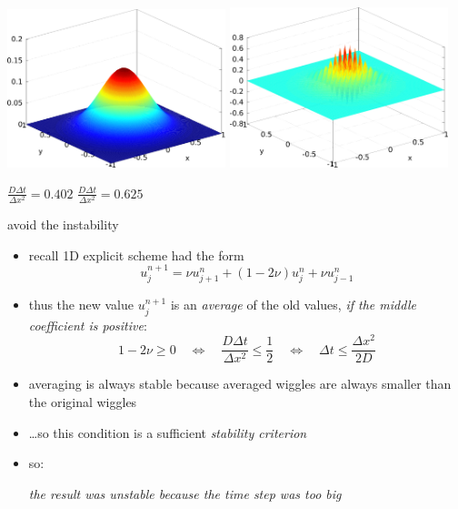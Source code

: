 \documentclass[titlepage,letterpaper,final,11pt]{scrartcl}
\begin{document}
\begin{center}
\includegraphics[width=2.5in]{stability}
\quad
\includegraphics[width=2.5in]{instability}

$\frac{D\Delta t}{\Delta x^2}= 0.402$ \quad
$\frac{D\Delta t}{\Delta x^2}= 0.625$
\end{center}

avoid the instability

\begin{itemize}
\item recall 1D explicit scheme had the form 
	$$u_j^{n+1} = \nu u_{j+1}^n + (1 - 2 \nu) u_j^n + \nu u_{j-1}^n$$
\item thus the new value $u_j^{n+1}$ is an \emph{average} of the old values, \emph{if the middle coefficient is positive}:
	$$1 - 2 \nu \ge 0 \quad \iff \quad  \frac{D\Delta t}{\Delta x^2} \le \frac{1}{2} \quad \iff \quad \Delta t \le \frac{\Delta x^2}{2 D}$$
\item averaging is always stable because averaged wiggles are always smaller than the original wiggles
\item \dots so this condition is a sufficient \emph{stability criterion}
\item so:

\begin{center}
\emph{the result was unstable because the time step was too big}
\end{center}
\end{itemize}
\end{document}
